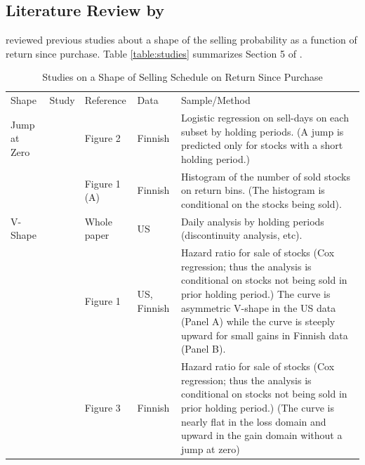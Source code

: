 \documentclass[11pt, a4paper]{article}
\begin{document}
\begin{appendices}
\section{Literature Review by \citet{BenDavidHirshleifer12}}
	\label{appendix:bendavid_hirshleifer}
	\renewcommand*{\thetable}{A\arabic{table}}%
	\renewcommand*{\thefigure}{A\arabic{figure}}%
	\renewcommand*{\theequation}{A\arabic{equation}}%
	\setcounter{table}{0}
	\setcounter{figure}{0}
	\setcounter{equation}{0}

\citet{BenDavidHirshleifer12} reviewed previous studies about a shape of the selling probability as a function of return since purchase. Table \ref{table:studies} summarizes Section 5 of \citet{BenDavidHirshleifer12}.

\begin{table}[H]
	\caption{Studies on a Shape of Selling Schedule on Return Since Purchase}
	\footnotesize
	\centering
	\begin{tabular}{>{\raggedright\arraybackslash}p{1.5cm} 
			>{\raggedright\arraybackslash}p{2.5cm} 
			>{\raggedright\arraybackslash}p{2.5cm} 
			>{\raggedright\arraybackslash}p{1.5cm} 
			>{\raggedright\arraybackslash}p{6cm}}
		\hline
		\addlinespace[0.1cm]
		Shape & Study & Reference & Data & Sample/Method \\ 
		\addlinespace[0.1cm]
		\hline
		\addlinespace[0.1cm]
		Jump at Zero & \citet{Kaustia10} & Figure 2 & Finnish & Logistic regression on sell-days on each subset by holding periods. (A jump is predicted only for stocks with a short holding period.)\\
		\addlinespace[0.3cm]
		             & \citet{GrinblattKeloharju01} & Figure 1 (A) & Finnish & Histogram of the number of sold stocks on return bins. (The histogram is conditional on the stocks being sold).\\
		\addlinespace[0.1cm]
		\hline
		\addlinespace[0.1cm]
		 V-Shape &  \citet{BenDavidHirshleifer12} & Whole paper & US  & Daily analysis by holding periods (discontinuity analysis, etc).  \\
		 \addlinespace[0.3cm]
		         & \citet{BarberOdean13} & Figure 1 & US, Finnish & Hazard ratio for sale of stocks (Cox regression; thus the analysis is conditional on stocks not being sold in prior holding period.) The curve is asymmetric V-shape in the US data (Panel A) while the curve is steeply upward for small gains in Finnish data (Panel B).\\
		 \addlinespace[0.3cm]
		          & \citet{SeruShumwayStoffman09} & Figure 3 & Finnish & Hazard ratio for sale of stocks (Cox regression; thus the analysis is conditional on stocks not being sold in prior holding period.) (The curve is nearly flat in the loss domain and upward in the gain domain without a jump at zero)\\

\end{tabular}
\end{table}
\end{appendices}
\end{document}
